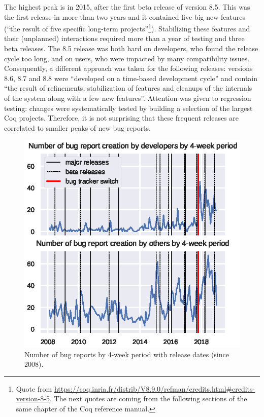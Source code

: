 \documentclass[conference]{IEEEtran}
\begin{document}
The highest peak is in 2015, after the first beta release of version
8.5. This was the first release in more than two years and it
contained five big new features (``the result of five specific
long-term projects''\footnote{Quote from
  \url{https://coq.inria.fr/distrib/V8.9.0/refman/credits.html\#credits-version-8-5}. The
  next quotes are coming from the following sections of the same
  chapter of the Coq reference manual.}). Stabilizing these features
and their (unplanned) interactions required more than a year of
testing and three beta releases. The 8.5 release was both hard on
developers, who found the release cycle too long, and on users, who
were impacted by many compatibility issues. Consequently, a different
approach was taken for the following releases: versions 8.6, 8.7 and
8.8 were ``developed on a time-based development cycle'' and contain
``the result of refinements, stabilization of features and cleanups of
the internals of the system along with a few new features''. Attention
was given to regression testing: changes were systematically tested by
building a selection of the largest Coq projects. Therefore, it is not
surprising that these frequent releases are correlated to smaller
peaks of new bug reports.

\begin{figure}
\includegraphics{bug_nb_with_releases.eps}
\caption{Number of bug reports by 4-week period with release dates (since 2008).} \label{bug_nb_with_releases}
\end{figure}
\end{document}
